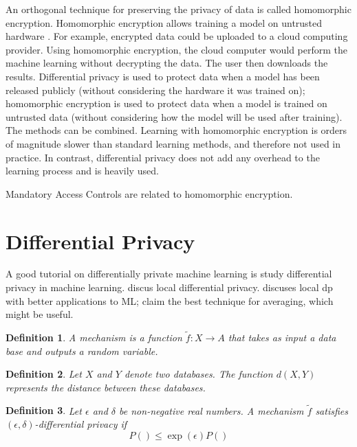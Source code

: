 \documentclass{icopust}
\newtheorem{defn}{Definition}
\begin{document}
An orthogonal technique for preserving the privacy of data is called homomorphic encryption.
Homomorphic encryption allows training a model on untrusted hardware \cite{graepel2012ml}.
For example, encrypted data could be uploaded to a cloud computing provider.
Using homomorphic encryption, the cloud computer would perform the machine learning without decrypting the data.
The user then downloads the results.
Differential privacy is used to protect data when a model has been released publicly 
(without considering the hardware it was trained on);
homomorphic encryption is used to protect data when a model is trained on untrusted data 
(without considering how the model will be used after training).
The methods can be combined.
Learning with homomorphic encryption is orders of magnitude slower than standard learning methods,
and therefore not used in practice.
In contrast, differential privacy does not add any overhead to the learning process and is heavily used.

Mandatory Access Controls are related to homomorphic encryption.


\section{Differential Privacy}

A good tutorial on differentially private machine learning is \cite{ji2016differential}
\cite{shokri2015privacy,abadi2016deep} study differential privacy in machine learning.
\cite{wainwright2012privacy} discus local differential privacy.
\cite{nguyen2016collecting} discuses local dp with better applications to ML; claim the best technique for averaging, which might be useful.

\begin{defn}
    A \emph{mechanism} is a function $\tilde f : X \to A$ that takes as input a data base and outputs a random variable.
\end{defn}

\begin{defn}
    Let $X$ and $Y$ denote two databases.
    The function $d(X,Y)$ represents the distance between these databases.
\end{defn}

\begin{defn}
    Let $\epsilon$ and $\delta$ be non-negative real numbers.
    A mechanism $\tilde f$ satisfies $(\epsilon,\delta)$-\emph{differential privacy} if
    \begin{equation}
        P() \le \exp(\epsilon)P()
    \end{equation}
\end{defn}
\end{document}

